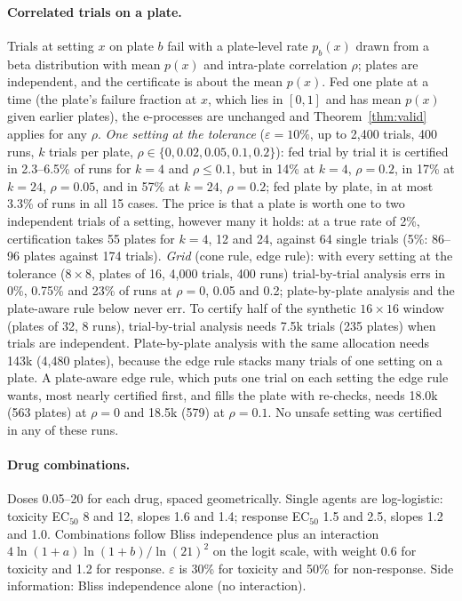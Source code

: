 \documentclass{article}
\newcommand{\eps}{\varepsilon}
\begin{document}
\paragraph{Correlated trials on a plate.} Trials at setting $x$ on plate
$b$ fail with a plate-level rate $p_b(x)$ drawn from a beta distribution with
mean $p(x)$ and intra-plate correlation $\rho$; plates are independent, and
the certificate is about the mean $p(x)$. Fed one plate at a time (the
plate's failure fraction at $x$, which lies in $[0,1]$ and has mean $p(x)$
given earlier plates), the e-processes are unchanged and Theorem~\ref{thm:valid}
applies for any $\rho$. \emph{One setting at the tolerance}
($\eps=10\%$, up to 2{,}400 trials, 400 runs, $k$ trials per plate,
$\rho\in\{0,0.02,0.05,0.1,0.2\}$): fed trial by trial it is certified in
2.3--6.5\% of runs for $k=4$ and $\rho\le0.1$, but in 14\% at $k=4$,
$\rho=0.2$, in 17\% at $k=24$, $\rho=0.05$, and in 57\% at $k=24$,
$\rho=0.2$; fed plate by plate, in at most 3.3\% of runs in all 15
cases. The price is that a plate is worth one to two independent trials of
a setting, however many it holds: at a true rate of 2\%, certification takes
55 plates for $k=4$, 12 and 24, against 64 single trials (5\%: 86--96
plates against 174 trials). \emph{Grid} (cone rule, edge rule): with every
setting at the tolerance ($8\times8$, plates of 16, 4{,}000 trials, 400
runs) trial-by-trial analysis errs in 0\%, 0.75\% and 23\% of runs at
$\rho=0$, 0.05 and 0.2; plate-by-plate analysis and the plate-aware rule
below never err. To certify half of the synthetic $16\times16$ window
(plates of 32, 8 runs), trial-by-trial analysis needs 7.5k trials (235
plates) when trials are independent. Plate-by-plate analysis with the same
allocation needs 143k (4{,}480 plates), because the edge rule stacks many
trials of one setting on a plate. A plate-aware edge rule, which puts one
trial on each setting the edge rule wants, most nearly certified first, and
fills the plate with re-checks, needs 18.0k (563 plates) at $\rho=0$ and
18.5k (579) at $\rho=0.1$. No unsafe setting was certified in any of these
runs.

\paragraph{Drug combinations.} Doses 0.05--20 for each drug, spaced
geometrically. Single agents are log-logistic: toxicity EC$_{50}$ 8 and 12,
slopes 1.6 and 1.4; response EC$_{50}$ 1.5 and 2.5, slopes 1.2 and 1.0.
Combinations follow Bliss independence plus an interaction
$4\ln(1+a)\ln(1+b)/\ln(21)^2$ on the logit scale, with weight 0.6 for
toxicity and 1.2 for response. $\eps$ is 30\% for toxicity and 50\% for
non-response. Side information: Bliss independence alone (no interaction).
\end{document}
